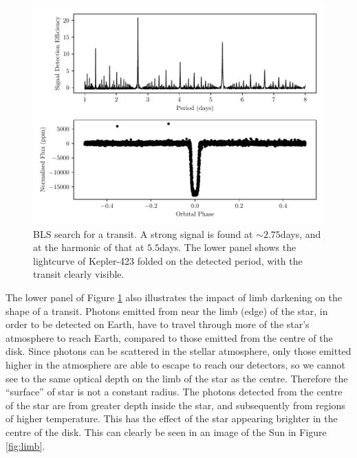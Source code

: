 \begin{figure}[H]
\centering

\includegraphics[width=0.75\columnwidth]{Kep_423_BLS_Detection.pdf}
\caption{BLS search for a transit. A strong signal is found at ${\sim}2.75$days, and at the harmonic of that at $5.5$days. The lower panel shows the lightcurve of Kepler-423 folded on the detected period, with the transit clearly visible.}
\label{fig:bls_phase}
\end{figure}
The lower panel of Figure \ref{fig:bls_phase} also illustrates the impact of limb darkening on the shape of a transit. Photons emitted from near the limb (edge) of the star, in order to be detected on Earth, have to travel through more of the star's atmosphere to reach Earth, compared to those emitted from the centre of the disk. Since photons can be scattered in the stellar atmosphere, only those emitted higher in the atmosphere are able to escape to reach our detectors, so we cannot see to the same optical depth on the limb of the star as the centre. Therefore the ``surface'' of star is not a constant radius. The photons detected from the centre of the star are from greater depth inside the star, and subsequently from regions of higher temperature. This has the effect of the star appearing brighter in the centre of the disk. This can clearly be seen in an image of the Sun in Figure \ref{fig:limb}.
